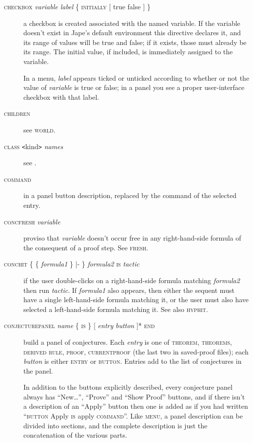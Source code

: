 \begin{description}
\item[\textsc{checkbox} \textit{variable label} \{ \textsc{initially [} true {\textbar} false \textsc{]} \}] a checkbox is created associated with the named variable. If the variable doesn't exist in Jape's default environment this directive declares it, and its range of values will be true and false; if it exists, those must already be its range. The initial value, if included, is immediately assigned to the variable.

In a menu, \textit{label} appears ticked or unticked according to whether or not the value of \textit{variable} is true or false; in a panel you see a proper user-interface checkbox with that label.

\item[\textsc{children}] see \textsc{world}. 

\item[\textsc{class}  \texttt{<}kind\texttt{>} \textit{names}] see .

\item[\textsc{command}] in a panel button description, replaced by the command of the selected entry.

\item[\textsc{concfresh} \textit{variable}] proviso that \textit{variable} doesn't occur free in any right-hand-side formula of the consequent of a proof step. See \textsc{fresh}.

\item[\textsc{conchit} \{ \{ \textit{formula1} \} |- \} \textit{formula2} \textsc{is} \textit{tactic}] if the user double-clicks on a right-hand-side formula matching \textit{formula2} then run \textit{tactic}. If \textit{formula1} also appears, then either the sequent must have a single left-hand-side formula matching it, or the user must also have selected a left-hand-side formula matching it. See also \textsc{hyphit}.

\item[\textsc{conjecturepanel} \textit{name} \{ \textsc{is} \} {[} \textit{entry} {\textbar} \textit{button} {]}* \textsc{end}] build a panel of conjectures. Each \textit{entry} is one of \textsc{theorem, theorems, derived rule, proof, currentproof} (the last two in saved-proof files); each \textit{button} is either \textsc{entry} or \textsc{button}. Entries add to the list of conjectures in the panel. 

In addition to the buttons explicitly described, every conjecture panel always has ``New\dots'', ``Prove'' and ``Show Proof'' buttons, and if there isn't a description of an ``Apply'' button then one is added as if you had written ``\textsc{button} Apply \textsc{is} apply \textsc{command}''. Like \textsc{menu}, a panel description can be divided into sections, and the complete description is just the concatenation of the various parts.


\end{description}
